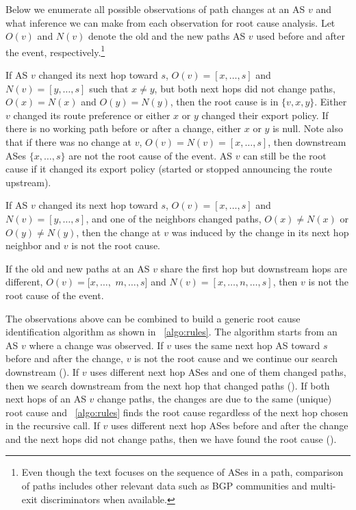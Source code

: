Below we enumerate all possible observations of path changes at an AS
$v$ and what inference we can make from each observation for root cause
analysis. Let $O(v)$ and $N(v)$ denote the old and the new paths AS
$v$ used before and after the event, respectively.\footnote{Even though the
text focuses on the sequence of ASes in a path, comparison of paths
includes other relevant data such as BGP communities and multi-exit
discriminators when available.}

  If AS $v$ changed its next
hop toward $s$, \ie $O(v) = [x, \ldots, s]$ and $N(v) = [y, \ldots, s]$ such that $x \neq y$,
but both next hops did not change paths, \ie $O(x) = N(x)$ and $O(y) =
N(y)$, then the root cause is in $\{v, x, y\}$.  Either $v$ changed its
route preference or either $x$ or $y$ changed their export policy.
If there is no working path before or after a change,
either $x$ or $y$ is null. Note also that if there was no change at $v$, 
\ie $O(v) = N(v) = [x, \ldots, s]$, then downstream ASes $\{x,
\ldots, s\}$ are not the root cause of the event.  AS $v$ can still be
the root cause if it changed its export policy (\ie started or stopped
announcing the route upstream). 

 If AS $v$ changed
its next hop toward $s$, \ie $O(v) = [x, \ldots, s]$ and $N(v) = [y,
\ldots, s]$, and one of the neighbors changed paths, \ie $O(x) \ne
N(x)$ or $O(y) \ne N(y)$, then the change at $v$ was induced by the
change in its next hop neighbor and $v$ is not the root
cause. 

  If the old and new
paths at an AS $v$ share the first hop but downstream hops are
different, \ie $O(v) = [x, \ldots,$ $m, \ldots, s]$ and $N(v) = [x,
\ldots, n, \ldots, s]$, then $v$ is not the root cause of the event.


\vspace{0.4em}The observations above can be combined to build a generic
root cause identification algorithm as shown in
\algstr~\ref{algo:rules}.  The algorithm starts from an AS $v$ where a
change was observed.  If $v$ uses the same next hop AS toward $s$ before
and after the change, $v$ is not the root cause and we continue our
search downstream (\downstreamC). If $v$ uses different next
hop ASes and one of them changed paths, then we search downstream from the
next hop that changed paths (\neighborC). If both next
hops of an AS $v$ change paths, the changes are due to the same (unique)
root cause and \algstr~\ref{algo:rules} finds the root cause regardless of
the next hop chosen in the recursive call.  If $v$ uses different next
hop ASes before and after the change and the next hops did not change
paths, then we have found the root cause (\localC).


